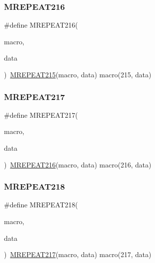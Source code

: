 \mbox{\label{group__group__sam0__utils__mrepeat_gab9f89f1489a59ce0b2fdaf9c5a1eb04b}} 
\subsubsection{\texorpdfstring{MREPEAT216}{MREPEAT216}}
{\footnotesize\ttfamily \#define M\+R\+E\+P\+E\+A\+T216(\begin{DoxyParamCaption}\item[{}]{macro,  }\item[{}]{data }\end{DoxyParamCaption})~\mbox{\hyperlink{group__group__sam0__utils__mrepeat_gae2a73793b6f0682b5b209181a2cce5c3}{M\+R\+E\+P\+E\+A\+T215}}(macro, data)   macro(215, data)}

\mbox{\label{group__group__sam0__utils__mrepeat_gac3e3763cfaa790bd77c54a125a5342ba}} 
\subsubsection{\texorpdfstring{MREPEAT217}{MREPEAT217}}
{\footnotesize\ttfamily \#define M\+R\+E\+P\+E\+A\+T217(\begin{DoxyParamCaption}\item[{}]{macro,  }\item[{}]{data }\end{DoxyParamCaption})~\mbox{\hyperlink{group__group__sam0__utils__mrepeat_gab9f89f1489a59ce0b2fdaf9c5a1eb04b}{M\+R\+E\+P\+E\+A\+T216}}(macro, data)   macro(216, data)}

\mbox{\label{group__group__sam0__utils__mrepeat_ga35dba4e312bc00bcfcbf099981b01206}} 
\subsubsection{\texorpdfstring{MREPEAT218}{MREPEAT218}}
{\footnotesize\ttfamily \#define M\+R\+E\+P\+E\+A\+T218(\begin{DoxyParamCaption}\item[{}]{macro,  }\item[{}]{data }\end{DoxyParamCaption})~\mbox{\hyperlink{group__group__sam0__utils__mrepeat_gac3e3763cfaa790bd77c54a125a5342ba}{M\+R\+E\+P\+E\+A\+T217}}(macro, data)   macro(217, data)}

